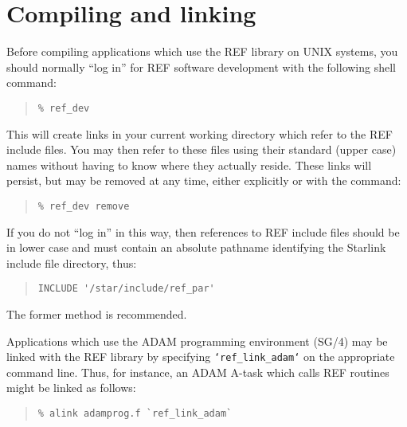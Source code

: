 \documentclass[twoside,11pt]{article}
\newcommand{\xref}[3]{#1}
\newcommand{\xlabel}[1]{}
\begin{document}
\section{\xlabel{compiling_and_linking}Compiling and linking}
\label{compiling_and_linking}

Before compiling applications which use the REF library on UNIX
systems, you should normally ``log in'' for REF software development
with the following shell command:

\begin{quote}
\begin{verbatim}
% ref_dev
\end{verbatim}
\end{quote}

This will create links in your current working directory which refer to
the REF include files. You may then refer to these files using their
standard (upper case) names without having to know where they actually
reside. These links will persist, but may be removed at any time,
either explicitly or with the command:

\begin{quote}
\begin{verbatim}
% ref_dev remove
\end{verbatim}
\end{quote}

If you do not ``log in'' in this way, then references to REF include files
should be in lower case and must contain an absolute pathname identifying the
Starlink include file directory, thus:

\begin{quote}
\begin{verbatim}
INCLUDE '/star/include/ref_par'
\end{verbatim}
\end{quote}

The former method is recommended.

Applications which use the ADAM programming environment
(\xref{SG/4}{sg4}{}) may be linked with the REF library by specifying
\texttt{`ref\_link\_adam`} on the appropriate command line. Thus, for
instance, an ADAM A-task which calls REF routines might be linked as
follows:

\begin{quote}
\begin{verbatim}
% alink adamprog.f `ref_link_adam`
\end{verbatim}
\end{quote}
\end{document}
